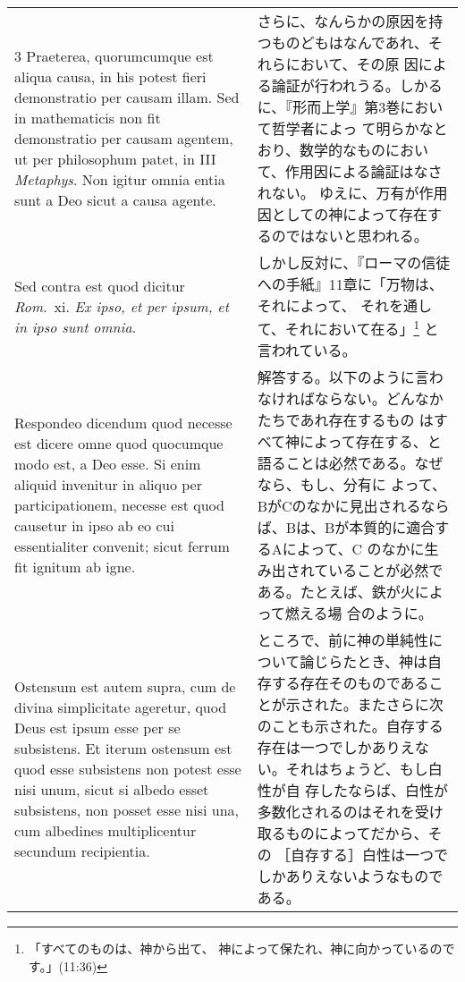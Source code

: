 \documentclass[10pt]{jsarticle} %
\begin{document}
\begin{longtable}{p{21em}p{21em}}
\\


3 {\sc Praeterea}, quorumcumque est aliqua causa, in his potest fieri
 demonstratio per causam illam. Sed in mathematicis non fit demonstratio
 per causam agentem, ut per philosophum patet, in III {\it Metaphys}. Non
 igitur omnia entia sunt a Deo sicut a causa agente.

&

さらに、なんらかの原因を持つものどもはなんであれ、それらにおいて、その原
 因による論証が行われうる。しかるに、『形而上学』第3巻において哲学者によっ
 て明らかなとおり、数学的なものにおいて、作用因による論証はなされない。
 ゆえに、万有が作用因としての神によって存在するのではないと思われる。

\\


{\sc Sed contra est} quod dicitur {\it Rom}.~{\sc xi}. {\it Ex ipso, et
 per ipsum, et in ipso sunt omnia}.

&
しかし反対に、『ローマの信徒への手紙』11章に「万物は、それによって、
 それを通して、それにおいて在る」\footnote{「すべてのものは、神から出て、
 神によって保たれ、神に向かっているのです。」(11:36)}
 と言われている。

\\

{\sc Respondeo dicendum} quod necesse est dicere omne quod quocumque modo est,
 a Deo esse. Si enim aliquid invenitur in aliquo per participationem,
 necesse est quod causetur in ipso ab eo cui essentialiter convenit;
 sicut ferrum fit ignitum ab igne. 

&

解答する。以下のように言わなければならない。どんなかたちであれ存在するもの
はすべて神によって存在する、と語ることは必然である。なぜなら、もし、分有に
よって、BがCのなかに見出されるならば、Bは、Bが本質的に適合するAによって、C
のなかに生み出されていることが必然である。たとえば、鉄が火によって燃える場
合のように。

\\

Ostensum est autem supra, cum de
 divina simplicitate ageretur, quod Deus est ipsum esse per se
 subsistens. Et iterum ostensum est quod esse subsistens non potest esse
 nisi unum, sicut si albedo esset subsistens, non posset esse nisi una,
 cum albedines multiplicentur secundum recipientia. 

&

ところで、前に神の単純性について論じらたとき、神は自
存する存在そのものであることが示された。またさらに次のことも示された。自存する存在は一つでしかありえない。それはちょうど、もし白性が自
存したならば、白性が多数化されるのはそれを受け取るものによってだから、その
［自存する］白性は一つでしかありえないようなものである。


\end{longtable}
\end{document}
